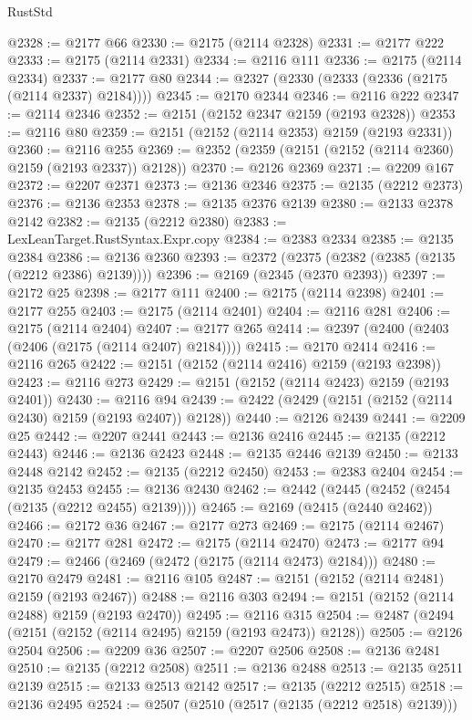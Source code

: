 \begin{lexlean}{RustStd}
\begin{coremodule}
@2328 := @2177 @66
@2330 := @2175 (@2114 @2328)
@2331 := @2177 @222
@2333 := @2175 (@2114 @2331)
@2334 := @2116 @111
@2336 := @2175 (@2114 @2334)
@2337 := @2177 @80
@2344 := @2327 (@2330 (@2333 (@2336 (@2175 (@2114 @2337) @2184))))
@2345 := @2170 @2344
@2346 := @2116 @222
@2347 := @2114 @2346
@2352 := @2151 (@2152 @2347 @2159 (@2193 @2328))
@2353 := @2116 @80
@2359 := @2151 (@2152 (@2114 @2353) @2159 (@2193 @2331))
@2360 := @2116 @255
@2369 := @2352 (@2359 (@2151 (@2152 (@2114 @2360) @2159 (@2193 @2337)) @2128))
@2370 := @2126 @2369
@2371 := @2209 @167
@2372 := @2207 @2371
@2373 := @2136 @2346
@2375 := @2135 (@2212 @2373)
@2376 := @2136 @2353
@2378 := @2135 @2376 @2139
@2380 := @2133 @2378 @2142
@2382 := @2135 (@2212 @2380)
@2383 := LexLeanTarget.RustSyntax.Expr.copy
@2384 := @2383 @2334
@2385 := @2135 @2384
@2386 := @2136 @2360
@2393 := @2372 (@2375 (@2382 (@2385 (@2135 (@2212 @2386) @2139))))
@2396 := @2169 (@2345 (@2370 @2393))
@2397 := @2172 @25
@2398 := @2177 @111
@2400 := @2175 (@2114 @2398)
@2401 := @2177 @255
@2403 := @2175 (@2114 @2401)
@2404 := @2116 @281
@2406 := @2175 (@2114 @2404)
@2407 := @2177 @265
@2414 := @2397 (@2400 (@2403 (@2406 (@2175 (@2114 @2407) @2184))))
@2415 := @2170 @2414
@2416 := @2116 @265
@2422 := @2151 (@2152 (@2114 @2416) @2159 (@2193 @2398))
@2423 := @2116 @273
@2429 := @2151 (@2152 (@2114 @2423) @2159 (@2193 @2401))
@2430 := @2116 @94
@2439 := @2422 (@2429 (@2151 (@2152 (@2114 @2430) @2159 (@2193 @2407)) @2128))
@2440 := @2126 @2439
@2441 := @2209 @25
@2442 := @2207 @2441
@2443 := @2136 @2416
@2445 := @2135 (@2212 @2443)
@2446 := @2136 @2423
@2448 := @2135 @2446 @2139
@2450 := @2133 @2448 @2142
@2452 := @2135 (@2212 @2450)
@2453 := @2383 @2404
@2454 := @2135 @2453
@2455 := @2136 @2430
@2462 := @2442 (@2445 (@2452 (@2454 (@2135 (@2212 @2455) @2139))))
@2465 := @2169 (@2415 (@2440 @2462))
@2466 := @2172 @36
@2467 := @2177 @273
@2469 := @2175 (@2114 @2467)
@2470 := @2177 @281
@2472 := @2175 (@2114 @2470)
@2473 := @2177 @94
@2479 := @2466 (@2469 (@2472 (@2175 (@2114 @2473) @2184)))
@2480 := @2170 @2479
@2481 := @2116 @105
@2487 := @2151 (@2152 (@2114 @2481) @2159 (@2193 @2467))
@2488 := @2116 @303
@2494 := @2151 (@2152 (@2114 @2488) @2159 (@2193 @2470))
@2495 := @2116 @315
@2504 := @2487 (@2494 (@2151 (@2152 (@2114 @2495) @2159 (@2193 @2473)) @2128))
@2505 := @2126 @2504
@2506 := @2209 @36
@2507 := @2207 @2506
@2508 := @2136 @2481
@2510 := @2135 (@2212 @2508)
@2511 := @2136 @2488
@2513 := @2135 @2511 @2139
@2515 := @2133 @2513 @2142
@2517 := @2135 (@2212 @2515)
@2518 := @2136 @2495
@2524 := @2507 (@2510 (@2517 (@2135 (@2212 @2518) @2139)))

\end{coremodule}
\end{lexlean}
